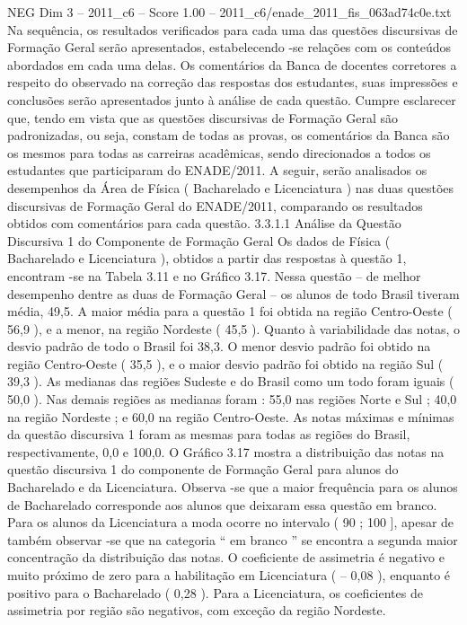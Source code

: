 \begin{textsample}{NEG Dim 3 – 2011\_c6 – Score 1.00 – 2011\_c6/enade\_2011\_fis\_063ad74c0e.txt}
Na sequência, os resultados verificados para cada uma das questões discursivas de Formação Geral serão apresentados, estabelecendo -se relações com os conteúdos abordados em cada uma delas.
Os comentários da Banca de docentes corretores a respeito do observado na correção das respostas dos estudantes, suas impressões e conclusões serão apresentados junto à análise de cada questão.
Cumpre esclarecer que, tendo em vista que as questões discursivas de Formação Geral são padronizadas, ou seja, constam de todas as provas, os comentários da Banca são os mesmos para todas as carreiras acadêmicas, sendo direcionados a todos os estudantes que participaram do ENADE/2011.
A seguir, serão analisados os desempenhos da Área de Física ( Bacharelado e Licenciatura ) nas duas questões discursivas de Formação Geral do ENADE/2011, comparando os resultados obtidos com comentários para cada questão. 3.3.1.1 Análise da Questão Discursiva 1 do Componente de Formação Geral Os dados de Física ( Bacharelado e Licenciatura ), obtidos a partir das respostas à questão 1, encontram -se na Tabela 3.11 e no Gráfico 3.17.
Nessa questão – de melhor desempenho dentre as duas de Formação Geral – os alunos de todo Brasil tiveram média, 49,5.
A maior média para a questão 1 foi obtida na região Centro-Oeste ( 56,9 ), e a menor, na região Nordeste ( 45,5 ).
Quanto à variabilidade das notas, o desvio padrão de todo o Brasil foi 38,3.
O menor desvio padrão foi obtido na região Centro-Oeste ( 35,5 ), e o maior desvio padrão foi obtido na região Sul ( 39,3 ).
As medianas das regiões Sudeste e do Brasil como um todo foram iguais ( 50,0 ).
Nas demais regiões as medianas foram : 55,0 nas regiões Norte e Sul ; 40,0 na região Nordeste ; e 60,0 na região Centro-Oeste.
As notas máximas e mínimas da questão discursiva 1 foram as mesmas para todas as regiões do Brasil, respectivamente, 0,0 e 100,0.
O Gráfico 3.17 mostra a distribuição das notas na questão discursiva 1 do componente de Formação Geral para alunos do Bacharelado e da Licenciatura.
Observa -se que a maior frequência para os alunos de Bacharelado corresponde aos alunos que deixaram essa questão em branco.
Para os alunos da Licenciatura a moda ocorre no intervalo ( 90 ; 100 ], apesar de também observar -se que na categoria “ em branco ” se encontra a segunda maior concentração da distribuição das notas.
O coeficiente de assimetria é negativo e muito próximo de zero para a habilitação em Licenciatura ( – 0,08 ), enquanto é positivo para o Bacharelado ( 0,28 ).
Para a Licenciatura, os coeficientes de assimetria por região são negativos, com exceção da região Nordeste.

\end{textsample}
